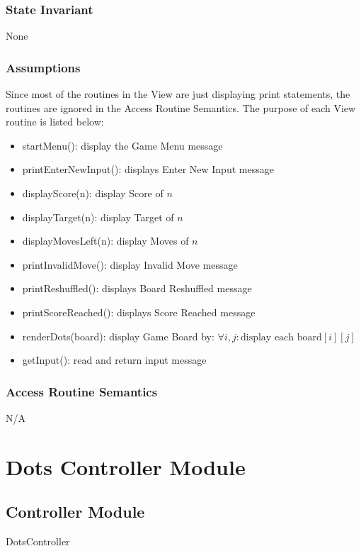 \documentclass[12pt]{article}
\begin{document}
\subsubsection* {State Invariant}
None

\subsubsection* {Assumptions}
Since most of the routines in the View are just displaying print statements, the routines are ignored in the Access Routine Semantics. The purpose of each View routine is listed below: 

\begin{itemize}
\item startMenu(): display the Game Menu message
\item printEnterNewInput(): displays Enter New Input message
\item displayScore(n): display Score of $n$ 
\item displayTarget(n): display Target of $n$ 
\item displayMovesLeft(n): display Moves of $n$ 
\item printInvalidMove(): display Invalid Move message
\item printReshuffled(): displays Board Reshuffled message
\item printScoreReached(): displays Score Reached message
\item renderDots(board): display Game Board by: $\forall i, j: \mbox{display each }  \mbox{board}[i][j] $
\item getInput(): read and return input message

\end{itemize}

\subsubsection* {Access Routine Semantics}
N/A

\newpage

\section* {Dots Controller Module}

\subsection* {Controller Module}

DotsController
\end{document}
